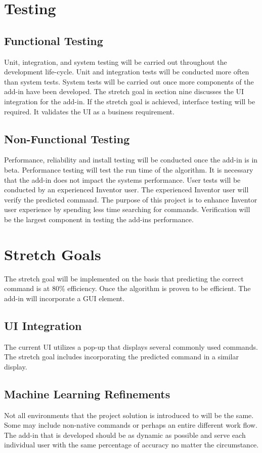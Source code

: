 \documentclass[onecolumn, draftclsnofoot,10pt, compsoc]{IEEEtran}
\begin{document}
\null\newpage
\section{Testing}
\subsection{Functional Testing}
Unit, integration, and system testing will be carried out throughout the  development life-cycle. Unit and integration tests will be conducted more often than system tests. System tests will be carried out once more components of the add-in have been developed. The stretch goal in section nine discusses the UI integration for the add-in. If the stretch goal is achieved, interface testing will be required. It validates the UI as a business requirement. 
\subsection{Non-Functional Testing}
Performance, reliability and install testing will be conducted once the add-in is in beta. Performance testing will test the run time of the algorithm. It is necessary that the add-in does not impact the systems performance. User tests will be conducted by an experienced Inventor user. The experienced Inventor user will verify the predicted command. The purpose of this project is to enhance Inventor user experience by spending less time searching for commands. Verification will be the largest component in testing the add-ins performance.  
\null\newpage
\section{Stretch Goals}
The stretch goal will be implemented on the basis that predicting the correct command is at 80\% efficiency. Once the algorithm is proven to be efficient. The add-in will incorporate a GUI element. 

\subsection{UI Integration}
The current UI utilizes a pop-up that displays several commonly used commands. The stretch goal includes incorporating the predicted command in a similar display.  

\subsection{Machine Learning Refinements}
Not all environments that the project solution is introduced to will be the same. Some may include non-native commands or perhaps an entire different work flow. The add-in that is developed should be as dynamic as possible and serve each individual user with the same percentage of accuracy no matter the circumstance. 
\end{document}
